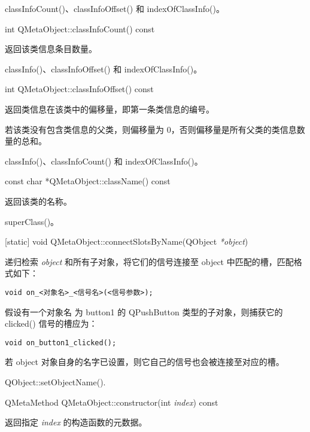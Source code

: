 
\begin{seeAlso}
classInfoCount()、classInfoOffset() 和 indexOfClassInfo()。
\end{seeAlso}

int QMetaObject::classInfoCount() const

返回该类信息条目数量。

\begin{seeAlso}
classInfo()、classInfoOffset() 和 indexOfClassInfo()。
\end{seeAlso}

int QMetaObject::classInfoOffset() const

返回类信息在该类中的偏移量，即第一条类信息的编号。

若该类没有包含类信息的父类，则偏移量为 0，否则偏移量是所有父类的类信息数量的总和。

\begin{seeAlso}
classInfo()、classInfoCount() 和 indexOfClassInfo()。
\end{seeAlso}

const char *QMetaObject::className() const

返回该类的名称。

\begin{seeAlso}
superClass()。
\end{seeAlso}

[static] void QMetaObject::connectSlotsByName(QObject \emph{*object})

递归检索 \emph{object} 和所有子对象，将它们的信号连接至 object 中匹配的槽，匹配格式如下：

\begin{lstlisting}
void on_<对象名>_<信号名>(<信号参数>);
\end{lstlisting}

假设有一个对象名 为 button1 的 QPushButton 类型的子对象，则捕获它的 clicked() 信号的槽应为：

\begin{lstlisting}
void on_button1_clicked();
\end{lstlisting}

若 object 对象自身的名字已设置，则它自己的信号也会被连接至对应的槽。

\begin{seeAlso}
QObject::setObjectName().
\end{seeAlso}

QMetaMethod QMetaObject::constructor(int \emph{index}) const

返回指定 \emph{index} 的构造函数的元数据。

